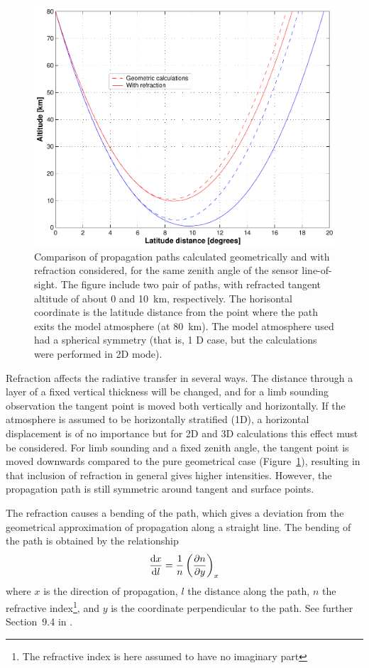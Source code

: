 \begin{figure}[!t]
 \begin{center}
  \includegraphics*[width=0.80\hsize]{Figs/ppath/ppath_refr1}
  \caption{Comparison of propagation paths calculated geometrically and 
    with refraction considered, for the same zenith angle of the
    sensor line-of-sight. The figure include two pair of paths, with
    refracted tangent altitude of about 0 and 10~km, respectively.
    The horisontal coordinate is the latitude distance from the point
    where the path exits the model atmosphere (at 80~km). The model
    atmosphere used had a spherical symmetry (that is, 1 D case, but
    the calculations were performed in 2D mode).}
  \label{fig:ppath:ppath_refr1}  
 \end{center}
\end{figure}

Refraction affects the radiative transfer in several ways. The
distance through a layer of a fixed vertical thickness will be
changed, and for a limb sounding observation the tangent point is
moved both vertically and horizontally. If the atmosphere is assumed
to be horizontally stratified (1D), a horizontal displacement is of no
importance but for 2D and 3D calculations this effect must be
considered. For limb sounding and a fixed zenith angle, the tangent
point is moved downwards compared to the pure geometrical case
(Figure~\ref{fig:ppath:ppath_refr1}), resulting in that inclusion of
refraction in general gives higher intensities. However, the
propagation path is still symmetric around tangent and surface points.

The refraction causes a bending of the path, which gives a deviation
from the geometrical approximation of propagation along a straight
line. The bending of the path is obtained by the relationship
\begin{equation}
  \frac{\mathrm{d} x}{\mathrm{d} l} = \frac{1}{n} \left( \frac{\partial n}{\partial y} \right)_x
  \label{eq:ppath:refrbend}
\end{equation}
where $x$ is the direction of propagation, $l$ the distance along the
path, $n$ the refractive index\footnote{The refractive index is here
  assumed to have no imaginary part}, and $y$ is the coordinate
perpendicular to the path. See further Section~9.4 in
\citet{rodgers:00}.

